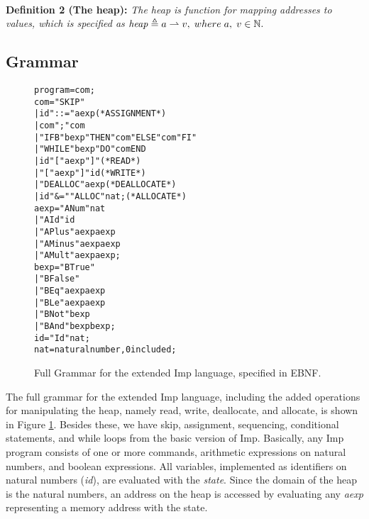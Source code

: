 \paragraph{}
\textbf{Definition 2 (The heap):} \textit{The heap is function for mapping addresses to values, which is specified as } $\mathit{heap} \mathrel{\triangleq} a\rightharpoonup v, \; where\; a, \;v \in \mathbb{N}.$

\subsection{Grammar}

\begin{figure}
\begin{alltt}
                  program = com ;
                  com =   "SKIP"
                        | id "::=" aexp            (* ASSIGNMENT *)
                        | com ";" com
                        | "IFB" bexp "THEN" com "ELSE" com "FI"
                        | "WHILE" bexp "DO" com END
                        | id \lsquigarr "[" aexp "]"       (* READ *)
                        | "[" aexp "]" \lsquigarr id       (* WRITE *)
                        | "DEALLOC" aexp           (* DEALLOCATE *)
                        | id "&=" "ALLOC" nat ;    (* ALLOCATE *)
                  aexp =  "ANum" nat
                        | "AId" id
                        | "APlus" aexp aexp
                        | "AMinus" aexp aexp
                        | "AMult" aexp aexp ;
                  bexp =  "BTrue"
                        | "BFalse"
                        | "BEq" aexp aexp
                        | "BLe" aexp aexp
                        | "BNot" bexp
                        | "BAnd" bexp bexp ;
                  id = "Id" nat ;
                  nat = natural number, 0 included ;
\end{alltt}
\caption{Full Grammar for the extended Imp language, specified in EBNF.}
\label{fig:imp_grammar}
\end{figure}

The full grammar for the extended Imp language, including the added operations for manipulating the heap, namely read, write, deallocate, and allocate, is shown in Figure \ref{fig:imp_grammar}. Besides these, we have skip, assignment, sequencing, conditional statements, and while loops from the basic version of Imp. Basically, any Imp program consists of one or more commands, arithmetic expressions on natural numbers, and boolean expressions. All variables, implemented as identifiers on natural numbers ({\it id}), are evaluated with the {\it state}. Since the domain of the heap is the natural numbers, an address on the heap is accessed by evaluating any {\it aexp} representing a memory address with the state.

